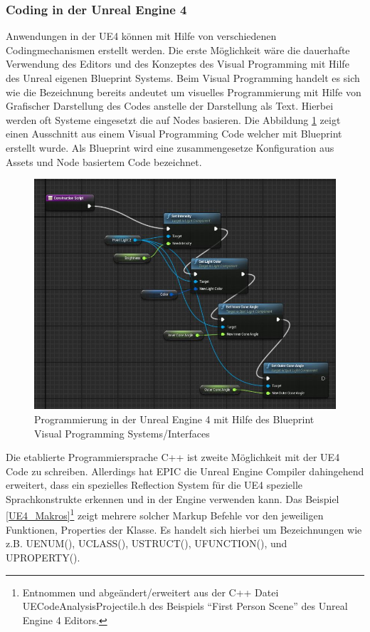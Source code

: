 \documentclass[pagesize, paper=a4, fontsize=12pt, titlepage=true, headings=small, headnosepline, abstractoff, liststotoc, nochapterprefix, plainheadsepline, twoside]{scrreprt}
\begin{document}
\subsubsection{Coding in der Unreal Engine 4}
Anwendungen in der UE4 können mit Hilfe von verschiedenen Codingmechanismen erstellt werden. Die erste Möglichkeit wäre die dauerhafte Verwendung des Editors und des Konzeptes des Visual Programming mit Hilfe des Unreal eigenen Blueprint Systems. Beim Visual Programming handelt es sich wie die Bezeichnung bereits andeutet um visuelles Programmierung mit Hilfe von Grafischer Darstellung des Codes anstelle der Darstellung als Text. Hierbei werden oft Systeme eingesetzt die auf Nodes basieren. Die Abbildung \ref{UE4Blueprint} zeigt einen Ausschnitt aus einem Visual Programming Code welcher mit Blueprint erstellt wurde. Als Blueprint wird eine zusammengesetze Konfiguration aus Assets und Node basiertem Code bezeichnet.

\begin{figure}[ht]
	\centering
	\includegraphics[width=\linewidth]{Bilder/ue4Blueprint.jpg}
	\caption{Programmierung in der Unreal Engine 4 mit Hilfe des Blueprint Visual Programming Systems/Interfaces}
	\label{UE4Blueprint}	
\end{figure} 

Die etablierte Programmiersprache C++ ist zweite Möglichkeit mit der UE4 Code zu schreiben. Allerdings hat EPIC die Unreal Engine Compiler dahingehend erweitert, dass ein spezielles Reflection System für die UE4 spezielle Sprachkonstrukte erkennen und in der Engine verwenden kann. Das Beispiel \ref{UE4_Makros}\footnote{Entnommen und abgeändert/erweitert aus der C++ Datei UECodeAnalysisProjectile.h des Beispiels “First Person Scene” des Unreal Engine 4 Editors.} zeigt mehrere solcher Markup Befehle vor den jeweiligen Funktionen, Properties der Klasse. Es handelt sich hierbei um Bezeichnungen wie z.B. UENUM(), UCLASS(), USTRUCT(), UFUNCTION(), und UPROPERTY().
\end{document}
